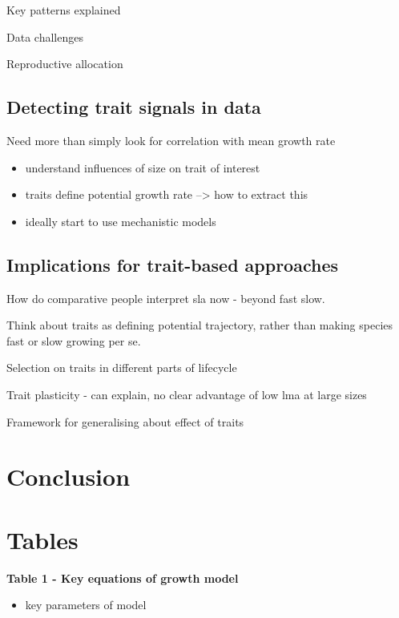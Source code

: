 \documentclass[12pt, a4paper]{article}
\begin{document}
Key patterns explained

Data challenges

Reproductive allocation

\subsection*{Detecting trait signals in
data}\label{detecting-trait-signals-in-data}

Need more than simply look for correlation with mean growth rate

\begin{itemize}
\itemsep1pt\parskip0pt
\item
  understand influences of size on trait of interest
\item
  traits define potential growth rate --\textgreater{} how to extract
  this
\item
  ideally start to use mechanistic models
\end{itemize}

\subsection*{Implications for trait-based
approaches}\label{implications-for-trait-based-approaches}

How do comparative people interpret sla now - beyond fast slow.

Think about traits as defining potential trajectory, rather than making
species fast or slow growing per se.

Selection on traits in different parts of lifecycle

Trait plasticity - can explain, no clear advantage of low lma at large
sizes

Framework for generalising about effect of traits

\section*{Conclusion}\label{conclusion}

\newpage

\section*{Tables}\label{tables}

\textbf{Table 1 - Key equations of growth model}

\begin{itemize}
\itemsep1pt\parskip0pt
\item
  key parameters of model
\end{itemize}
\end{document}
